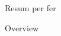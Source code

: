 \documentclass[catalan,final]{setup/eetac_tfc_pfc}
\begin{document}

\beforepreface


\begin{resum}{10cm}
Resum per fer
\end{resum}

\begin{overview}{11cm}
Overview
\end{overview}





\afterpreface




%         

\end{document}

